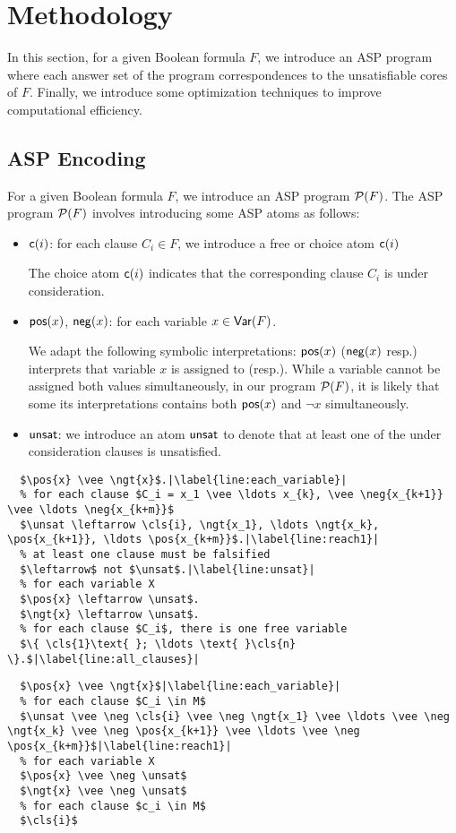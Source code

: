 \section{Methodology}
In this section, for a given Boolean formula $F$, we introduce an ASP program where each answer set of the program correspondences to the unsatisfiable cores of $F$.
Finally, we introduce some optimization techniques to improve computational efficiency.  
\subsection{ASP Encoding}
For a given Boolean formula $F$, we introduce an ASP program $\mathcal{P}(F)$.
The ASP program $\mathcal{P}(F)$ involves introducing some ASP atoms as follows:
\begin{itemize}
  \item $\mathsf{c}(i)$: for each clause $C_i \in F$, we introduce a free or choice atom $\mathsf{c}(i)$
  
  The choice atom $\mathsf{c}(i)$ indicates that the corresponding clause $C_i$ is under consideration. 
  \item $\mathsf{pos}(x)$, $\mathsf{neg}(x)$: for each variable $x \in \mathsf{Var}(F)$. 
  
  We adapt the following symbolic interpretations: $\mathsf{pos}(x)$ ($\mathsf{neg}(x)$ resp.) interprets that variable $x$ is assigned to \true (\false resp.). While 
  a variable cannot be assigned both values simultaneously, in our program $\mathcal{P}(F)$, it is likely that some its interpretations contains both $\mathsf{pos}(x)$ and $\neg{x}$ simultaneously. 
  \item $\mathsf{unsat}$: we introduce an atom $\mathsf{unsat}$ to denote that at least one of the under consideration clauses is unsatisfied.
\end{itemize}
\begin{lstlisting}[caption={Program $\program{F}$},label={code:as_to_uc},captionpos=b,mathescape=true,escapechar=|,float]
  % for each variable $x \in X$
  $\pos{x} \vee \ngt{x}$.|\label{line:each_variable}|
  % for each clause $C_i = x_1 \vee \ldots x_{k}, \vee \neg{x_{k+1}} \vee \ldots \neg{x_{k+m}}$
  $\unsat \leftarrow \cls{i}, \ngt{x_1}, \ldots \ngt{x_k}, \pos{x_{k+1}}, \ldots \pos{x_{k+m}}$.|\label{line:reach1}|
  % at least one clause must be falsified
  $\leftarrow$ not $\unsat$.|\label{line:unsat}|
  % for each variable X
  $\pos{x} \leftarrow \unsat$.
  $\ngt{x} \leftarrow \unsat$.
  % for each clause $C_i$, there is one free variable
  $\{ \cls{1}\text{ }; \ldots \text{ }\cls{n} \}.$|\label{line:all_clauses}|
\end{lstlisting}
\begin{lstlisting}[caption={Reduct of $\program{F}$ w.r.t. $M$},label={code:program_to_reduct},captionpos=b,mathescape=true,escapechar=|,float]
  % for each variable $x \in X$
  $\pos{x} \vee \ngt{x}$|\label{line:each_variable}|
  % for each clause $C_i \in M$
  $\unsat \vee \neg \cls{i} \vee \neg \ngt{x_1} \vee \ldots \vee \neg \ngt{x_k} \vee \neg \pos{x_{k+1}} \vee \ldots \vee \neg \pos{x_{k+m}}$|\label{line:reach1}|
  % for each variable X
  $\pos{x} \vee \neg \unsat$
  $\ngt{x} \vee \neg \unsat$
  % for each clause $c_i \in M$
  $\cls{i}$
\end{lstlisting}

